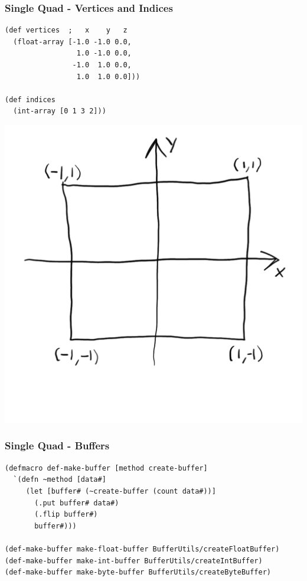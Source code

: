 \documentclass[aspectratio=169,11pt,xcolor=dvipsnames]{beamer}
\begin{document}
\begin{frame}[fragile]
  \frametitle{Single Quad {-} Vertices and Indices}
  \begin{minipage}[c]{.48\textwidth}
    \begin{verbatim}
(def vertices  ;   x    y   z
  (float-array [-1.0 -1.0 0.0,
                 1.0 -1.0 0.0,
                -1.0  1.0 0.0,
                 1.0  1.0 0.0]))

(def indices
  (int-array [0 1 3 2]))
    \end{verbatim}
  \end{minipage}
  \begin{minipage}[c]{.48\textwidth}
    \includegraphics[width=\textwidth]{quadcoords}
  \end{minipage}
\end{frame}

\begin{frame}[fragile]
  \frametitle{Single Quad {-} Buffers}
  \begin{verbatim}
(defmacro def-make-buffer [method create-buffer]
  `(defn ~method [data#]
     (let [buffer# (~create-buffer (count data#))]
       (.put buffer# data#)
       (.flip buffer#)
       buffer#)))

(def-make-buffer make-float-buffer BufferUtils/createFloatBuffer)
(def-make-buffer make-int-buffer BufferUtils/createIntBuffer)
(def-make-buffer make-byte-buffer BufferUtils/createByteBuffer)
  \end{verbatim}
\end{frame}
\end{document}
